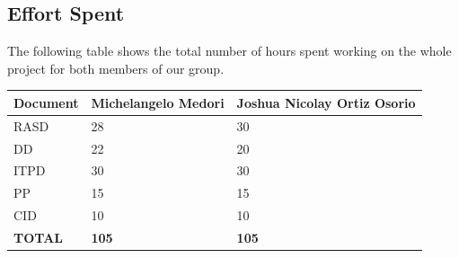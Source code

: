\documentclass{article}
\begin{document}
\begin{flushleft}
\section{Effort Spent}

The following table shows the total number of hours spent  working on the whole project for both members of our group.


  \begin{center}
    \begin{tabular}{ | p{2cm} | p{5cm} | p{5cm} |}
    \hline

      \textbf{Document} & \textbf{Michelangelo Medori} &  \textbf{Joshua Nicolay Ortiz Osorio}  \\ 
    \hline
    
    RASD & 28  & 30\\
    \hline
    DD & 22 & 20\\
       \hline
    ITPD & 30 & 30 \\
       \hline
    PP & 15 & 15 \\
       \hline
    CID & 10 & 10 \\
     
  \hline
  \textbf{TOTAL} & \textbf{105} & \textbf{105}\\
\hline
  
    \end{tabular}
\end{center}




























 \end{flushleft}
\end{document}
